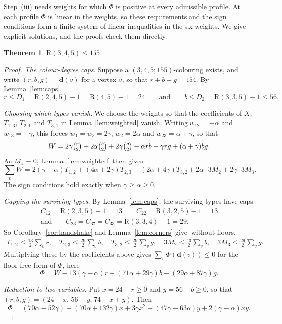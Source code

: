 \documentclass[11pt]{article}
\theoremstyle{spacedplain}
\newtheorem{theorem}{Theorem}[section]
\theoremstyle{spaceddef}
\theoremstyle{spacedremark}
\newcommand{\R}{\mathrm{R}}
\providecommand{\mkbreak}[1]{#1}%
\begin{document}
Step~(iii) needs weights for which $\Phi$ is positive at every admissible profile.
At each profile $\Phi$ is linear in the weights, so these requirements and the sign conditions form a finite system of linear inequalities in the six weights.
We give explicit solutions, and the proofs check them directly.

\begin{theorem}\label{thm:345}
$\R(3,4,5)\le 155$.
\end{theorem}

\begin{proof}
\emph{The colour-degree caps.}
Suppose a $(3,4,5;155)$-colouring exists, and write $(r,b,g)=\mathbf d(v)$ for a vertex $v$, so that $r+b+g=154$.
By Lemma~\ref{lem:caps},
\[
r\le D_1=\R(2,4,5)-1=\R(4,5)-1=24\qquad\text{and}\qquad b\le D_2=\R(3,3,5)-1\le 56.
\]

\emph{Choosing which types vanish.}
We choose the weights so that the coefficients of $X$, $T_{1,3}$, $T_{2,1}$ and $T_{3,1}$ in Lemma~\ref{lem:weighted} vanish.
Writing $w_{12}=-\alpha$ and $w_{13}=-\gamma$, this forces $w_1=w_3=2\gamma$, $w_2=2\alpha$ and $w_{23}=\alpha+\gamma$, so that
\[
W=2\gamma\tbinom r2+2\alpha\tbinom b2+2\gamma\tbinom g2-\alpha rb-\gamma rg+(\alpha+\gamma)bg .
\]
As $M_1=0$, Lemma~\ref{lem:weighted} then gives
\[
\sum_vW=2(\gamma-\alpha)T_{1,2}+(4\alpha+2\gamma)T_{2,3}+(2\alpha+4\gamma)T_{3,2}+2\alpha\cdot 3M_2+2\gamma\cdot 3M_3 .
\]
The sign conditions hold exactly when $\gamma\ge\alpha\ge 0$.

\emph{Capping the surviving types.}
By Lemma~\ref{lem:caps}, the surviving types have caps
\begin{gather*}
C_{12}=\R(2,3,5)-1=13\qquad C_{22}=\R(3,2,5)-1=13\\
\text{and}\qquad C_{23}=C_{32}=C_{33}=\R(3,3,4)-1=29.
\end{gather*}
So Corollary~\ref{cor:handshake} and Lemma~\ref{lem:corners} give, without floors,
\[
\begin{gathered}
T_{1,2}\le\tfrac{13}2\textstyle\sum_v r,\quad T_{2,3}\le\tfrac{29}2\sum_v b,\quad T_{3,2}\le\tfrac{29}2\sum_v g,\mkbreak{\quad} 3M_2\le\tfrac{13}2\sum_v b,\quad 3M_3\le\tfrac{29}2\sum_v g.
\end{gathered}
\]
Multiplying these by the coefficients above gives $\sum_v\Phi(\mathbf d(v))\le 0$ for the floor-free form of $\Phi$, here
\[
\Phi=W-13(\gamma-\alpha)r-(71\alpha+29\gamma)b-(29\alpha+87\gamma)g .
\]

\emph{Reduction to two variables.}
Put $x=24-r\ge0$ and $y=56-b\ge 0$, so that $(r,b,g)=(24-x,\,56-y,\,74+x+y)$.
Then
\[
\Phi=(70\alpha-52\gamma)+(70\alpha+132\gamma)x+3\gamma x^2+(47\gamma-63\alpha)y+2(\gamma-\alpha)xy .
\]


\end{proof}
\end{document}
